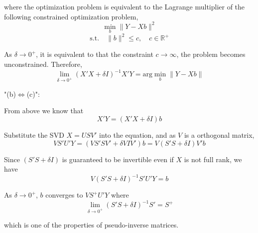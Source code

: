 \documentclass[a4paper]{article}
\begin{document}
where the optimization problem is equivalent to the Lagrange multiplier of the following constrained optimization problem,
\[\min_b \lVert Y-Xb \rVert^2\]
\[\text{s.t.}\quad \lVert b \rVert^2 \leq c,\quad c\in\mathbb{R}^{+}\]

As $\delta\to 0^{+}$, it is equivalent to that the constraint $c\to\infty$, the problem becomes unconstrained. Therefore, 
\[\lim_{\delta\to 0^{+}}(X'X+\delta I)^{-1} X'Y =\text{arg}\min_b \lVert Y-Xb \rVert\]

"(b)$\Leftrightarrow$(c)":\newline

From above we know that
\[X'Y=(X'X+\delta I)b\]

Substitute the SVD $X=USV'$ into the equation, and as $V$ is a orthogonal matrix,
\[VS'U'Y=(VS'SV'+\delta VIV')b=V(S'S+\delta I)V'b\]

Since $(S'S+\delta I)$ is guaranteed to be invertible even if $X$ is not full rank, we have
\[V (S'S+\delta I)^{-1} S'U'Y=b\]

As $\delta\to 0^{+}$, $b$ converges to $VS^{+}U'Y$ where
\[\lim_{\delta\to 0^{+}}(S'S+\delta I)^{-1} S'=S^{+}\]

which is one of the properties of pseudo-inverse matrices.\newline 
\end{document}
